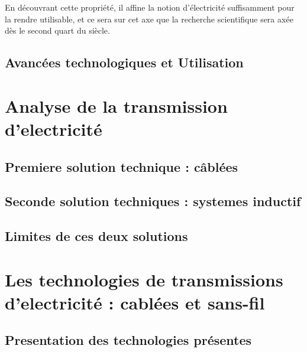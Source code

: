 \documentclass[11pt]{report}
\begin{document}
    En découvrant cette propriété, il affine la notion d'électricité suffisamment pour la rendre utilisable, et ce sera sur cet axe que la recherche scientifique sera axée dès le second quart du siècle.
\section{Avancées technologiques et Utilisation}

\chapter{Analyse de la transmission d'electricité} %
\section{Premiere solution technique : câblées}
\section{Seconde solution techniques : systemes inductif}
\section{Limites de ces deux solutions}

\chapter{Les technologies de transmissions d'electricité : cablées et sans-fil} %
\section{Presentation des technologies présentes}
\end{document}
